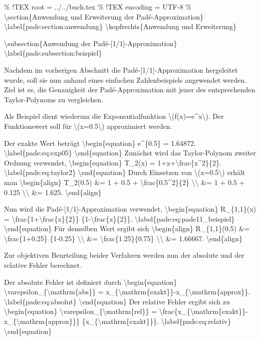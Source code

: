 \% !TEX root = ../../buch.tex \% !TEX encoding = UTF-8 \%
\textbackslash section\{Anwendung und Erweiterung der
Padé-Approximation\} \textbackslash label\{pade:section:anwendung\}
\textbackslash kopfrechts\{Anwendung und Erweiterung\}

\textbackslash subsection\{Anwendung der Padé-{[}1/1{]}-Approximation\}
\textbackslash label\{pade:subsection:beispiel\}

Nachdem im vorherigen Abschnitt die Padé-{[}1/1{]}-Approximation
hergeleitet wurde, soll sie nun anhand eines einfachen Zahlenbeispiels
angewendet werden. Ziel ist es, die Genauigkeit der Padé-Approximation
mit jener des entsprechenden Taylor-Polynoms zu vergleichen.

Als Beispiel dient wiederum die Exponentialfunktion
\textbackslash(f(x)=e\^{}x\textbackslash). Der Funktionswert soll für
\textbackslash(x=0.5\textbackslash) approximiert werden.

Der exakte Wert beträgt \textbackslash begin\{equation\} e\^{}\{0.5\} =
1.64872. \textbackslash label\{pade:eq:exp05\}
\textbackslash end\{equation\} Zunächst wird das Taylor-Polynom zweiter
Ordnung verwendet, \textbackslash begin\{equation\} T\_2(x) =
1+x+\textbackslash frac\{x\^{}2\}\{2\}.
\textbackslash label\{pade:eq:taylor2\} \textbackslash end\{equation\}
Durch Einsetzen von \textbackslash(x=0.5\textbackslash) erhält man
\textbackslash begin\{align\} T\_2(0.5) \&= 1 + 0.5 +
\textbackslash frac\{0.5\^{}2\}\{2\} \textbackslash\textbackslash{} \&=
1 + 0.5 + 0.125 \textbackslash\textbackslash{} \&= 1.625.
\textbackslash end\{align\}

Nun wird die Padé-{[}1/1{]}-Approximation verwendet,
\textbackslash begin\{equation\} R\_\{1,1\}(x) =
\textbackslash frac\{1+\textbackslash frac\{x\}\{2\}\}
\{1-\textbackslash frac\{x\}\{2\}\}.
\textbackslash label\{pade:eq:pade11\_beispiel\}
\textbackslash end\{equation\} Für denselben Wert ergibt sich
\textbackslash begin\{align\} R\_\{1,1\}(0.5) \&=
\textbackslash frac\{1+0.25\} \{1-0.25\} \textbackslash\textbackslash{}
\&= \textbackslash frac\{1.25\}\{0.75\} \textbackslash\textbackslash{}
\&= 1.66667. \textbackslash end\{align\}

Zur objektiven Beurteilung beider Verfahren werden nun der absolute und
der relative Fehler berechnet.

Der absolute Fehler ist definiert durch \textbackslash begin\{equation\}
\textbackslash varepsilon\_\{\textbackslash mathrm\{abs\}\} =
\textbar x\_\{\textbackslash mathrm\{exakt\}\}-x\_\{\textbackslash mathrm\{approx\}\}\textbar.
\textbackslash label\{pade:eq:absolut\} \textbackslash end\{equation\}
Der relative Fehler ergibt sich zu \textbackslash begin\{equation\}
\textbackslash varepsilon\_\{\textbackslash mathrm\{rel\}\} =
\textbackslash frac\{\textbar x\_\{\textbackslash mathrm\{exakt\}\}-x\_\{\textbackslash mathrm\{approx\}\}\textbar\}
\{\textbar x\_\{\textbackslash mathrm\{exakt\}\}\textbar\}.
\textbackslash label\{pade:eq:relativ\} \textbackslash end\{equation\}

